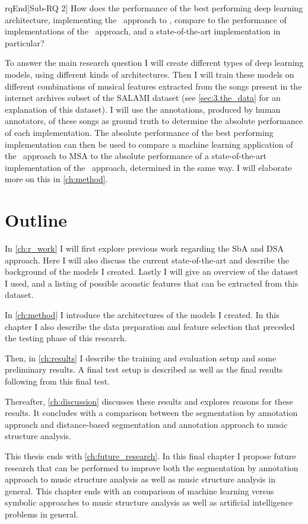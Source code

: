 \begin{theoremEnd}[restate,category=rq]{rqEnd}[Sub-RQ 2]
    \label{rq:sub2}
    How does the performance of the best performing deep learning architecture, implementing the \sba\ approach to \msa, compare to the performance of implementations of the \dsa\ approach, and a state-of-the-art implementation in particular?
\end{theoremEnd}

To answer the main research question I will create different types of deep learning models, using different kinds of architectures. Then I will train these models on different combinations of musical features extracted from the songs present in the internet archives subset of the SALAMI dataset (see \autoref{sec:3.the_data} for an explanation of this dataset). I will use the annotations, produced by human annotators, of these songs as ground truth to determine the absolute performance of each implementation. The absolute performance of the best performing implementation can then be used to compare a machine learning application of the \sba\ approach to MSA to the absolute performance of a state-of-the-art implementation of the \dsa\ approach, determined in the same way. I will elaborate more on this in \autoref{ch:method}.


\section{Outline}
In \autoref{ch:r_work} I will first explore previous work regarding the SbA and DSA approach. Here I will also discuss the current state-of-the-art and describe the background of the models I created. Lastly I will give an overview of the dataset I used, and a listing of possible acoustic features that can be extracted from this dataset.

In \autoref{ch:method} I introduce the architectures of the models I created. In this chapter I also describe the data preparation and feature selection that preceded the testing phase of this research.

Then, in \autoref{ch:results} I describe the training and evaluation setup and some preliminary results. A final test setup is described as well as the final results following from this final test.

Thereafter, \autoref{ch:discussion} discusses these results and explores reasons for these results. It concludes with a comparison between the segmentation by annotation approach and distance-based segmentation and annotation approach to music structure analysis.

This thesis ends with \autoref{ch:future_research}. In this final chapter I propose future research that can be performed to improve both the segmentation by annotation approach to music structure analysis as well as music structure analysis in general. This chapter ends with an comparison of machine learning versus symbolic approaches to music structure analysis as well as artificial intelligence problems in general.